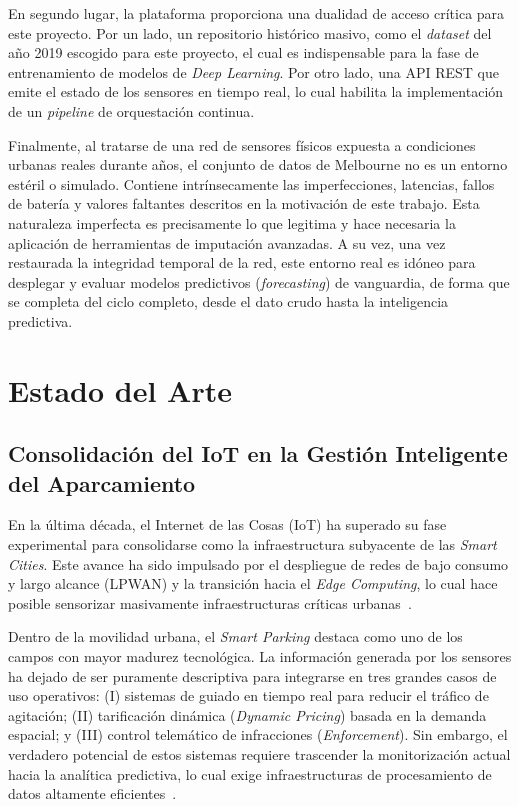 En segundo lugar, la plataforma proporciona una dualidad de acceso crítica para este proyecto. Por un lado, un repositorio histórico masivo, como el \textit{dataset} del año 2019 escogido para este proyecto, el cual es indispensable para la fase de entrenamiento de modelos de \textit{Deep Learning}. Por otro lado, una API REST que emite el estado de los sensores en tiempo real, lo cual habilita la implementación de un \textit{pipeline} de orquestación continua.

Finalmente, al tratarse de una red de sensores físicos expuesta a condiciones urbanas reales durante años, el conjunto de datos de Melbourne no es un entorno estéril o simulado. Contiene intrínsecamente las imperfecciones, latencias, fallos de batería y valores faltantes descritos en la motivación de este trabajo. Esta naturaleza imperfecta es precisamente lo que legitima y hace necesaria la aplicación de herramientas de imputación avanzadas. A su vez, una vez restaurada la integridad temporal de la red, este entorno real es idóneo para desplegar y evaluar modelos predictivos (\textit{forecasting}) de vanguardia, de forma que se completa del ciclo completo, desde el dato crudo hasta la inteligencia predictiva.

\section{Estado del Arte}
\label{sec:estado_arte}

\subsection{Consolidación del IoT en la Gestión Inteligente del Aparcamiento}
\label{subsec:estado_iot}

En la última década, el Internet de las Cosas (IoT) ha superado su fase experimental para consolidarse como la infraestructura subyacente de las \textit{Smart Cities}. Este avance ha sido impulsado por el despliegue de redes de bajo consumo y largo alcance (LPWAN) y la transición hacia el \textit{Edge Computing}, lo cual hace posible sensorizar masivamente infraestructuras críticas urbanas~\cite{alavi2018internet}.

Dentro de la movilidad urbana, el \textit{Smart Parking} destaca como uno de los campos con mayor madurez tecnológica. La información generada por los sensores ha dejado de ser puramente descriptiva para integrarse en tres grandes casos de uso operativos: (I) sistemas de guiado en tiempo real para reducir el tráfico de agitación; (II) tarificación dinámica (\textit{Dynamic Pricing}) basada en la demanda espacial; y (III) control telemático de infracciones (\textit{Enforcement}). Sin embargo, el verdadero potencial de estos sistemas requiere trascender la monitorización actual hacia la analítica predictiva, lo cual exige infraestructuras de procesamiento de datos altamente eficientes~\cite{lin2017survey}.


